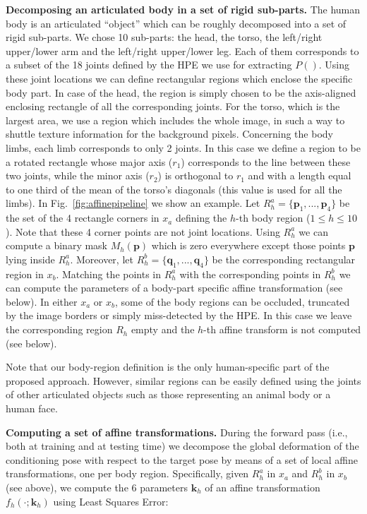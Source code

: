 \documentclass[10pt,twocolumn,letterpaper]{article}
\begin{document}
{\bf Decomposing an articulated body in a set of rigid sub-parts.} 
The human body is an articulated ``object'' which can be roughly decomposed into a set of rigid sub-parts. We chose 10 sub-parts: the head, the torso, the left/right upper/lower arm and the  left/right upper/lower leg. Each of them corresponds to a subset of the 18 joints defined by the HPE  \cite{Cao} we use for extracting $P()$. 
Using these  joint locations we can define rectangular regions which enclose the specific body part.
In case of  the head, the  region is simply chosen to be the axis-aligned enclosing rectangle of all the corresponding joints. For the torso, which is the largest area, we use a region which includes  the whole image, in such a way to shuttle  texture information for the background pixels.
Concerning the body limbs, each limb corresponds to only 2 joints. In this case we define a region to be a rotated rectangle whose major axis ($r_1$) corresponds to the line between these two joints, while the minor axis ($r_2$) is orthogonal to $r_1$ and with a length equal to one third of the mean of the torso's diagonals (this value is used for all the limbs). In Fig.~\ref{fig:affinepipeline} we show an example.
 Let $R_h^a = \{ \mathbf{p}_1, ..., \mathbf{p}_4 \}$ be the set of the 4 rectangle corners in $x_a$ defining the $h$-th body region ($1 \leq h \leq 10$).
 Note that these 4 corner points are not joint locations.
 Using $R_h^a$   we can compute a binary mask  $M_h(\mathbf{p})$ which is zero everywhere except those points $\mathbf{p}$ lying inside  $R_h^a$.
Moreover, let $R_h^b = \{ \mathbf{q}_1, ..., \mathbf{q}_4 \}$ be the corresponding rectangular region in $x_b$. Matching the points in $R_h^a$ with the corresponding points in $R_h^b$ we can compute the parameters of a body-part specific affine transformation (see below).
In  either  $x_a$ or $x_b$, some of the body regions can be occluded, truncated by the image borders or simply miss-detected by the HPE. In this case we leave  the corresponding region $R_h$ empty and the $h$-th affine transform is not computed (see below). 

Note  that our body-region definition  is the only human-specific part of the proposed approach. However, similar regions can be easily defined using the joints of other articulated objects such as those representing an animal body  or a human face.




{\bf Computing a set of affine transformations.} 
During the forward pass (i.e., both at training and at testing time) we decompose the global deformation of the conditioning pose with respect to the target pose by means of a set of local affine transformations, one per body region. Specifically, given $R_h^a$ in $x_a$ and $R_h^b$ in $x_b$ (see above), we compute the 6  parameters $\mathbf{k}_h$ of an affine transformation $f_h(\cdot ; \mathbf{k}_h)$
using Least Squares Error:
\end{document}
